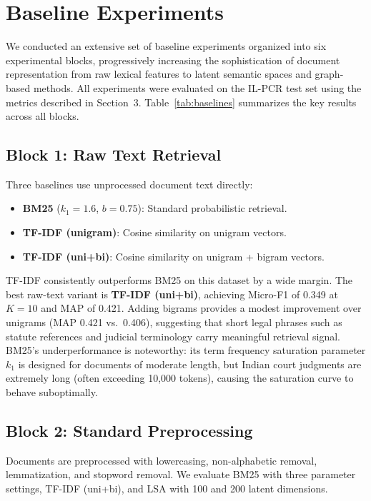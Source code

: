 \documentclass[11pt]{article}
\begin{document}
\section{Baseline Experiments}

We conducted an extensive set of baseline experiments organized into six experimental blocks, progressively increasing the sophistication of document representation from raw lexical features to latent semantic spaces and graph-based methods.
All experiments were evaluated on the IL-PCR test set using the metrics described in Section~3.
Table~\ref{tab:baselines} summarizes the key results across all blocks.

\subsection{Block 1: Raw Text Retrieval}

Three baselines use unprocessed document text directly:
\begin{itemize}
    \item \textbf{BM25} ($k_1{=}1.6$, $b{=}0.75$): Standard probabilistic retrieval.
    \item \textbf{TF-IDF (unigram)}: Cosine similarity on unigram vectors.
    \item \textbf{TF-IDF (uni+bi)}: Cosine similarity on unigram + bigram vectors.
\end{itemize}

TF-IDF consistently outperforms BM25 on this dataset by a wide margin.
The best raw-text variant is \textbf{TF-IDF (uni+bi)}, achieving Micro-F1 of 0.349 at $K{=}10$ and MAP of 0.421.
Adding bigrams provides a modest improvement over unigrams (MAP 0.421 vs.~0.406), suggesting that short legal phrases such as statute references and judicial terminology carry meaningful retrieval signal.
BM25's underperformance is noteworthy: its term frequency saturation parameter $k_1$ is designed for documents of moderate length, but Indian court judgments are extremely long (often exceeding 10,000 tokens), causing the saturation curve to behave suboptimally.

\subsection{Block 2: Standard Preprocessing}

Documents are preprocessed with lowercasing, non-alphabetic removal, lemmatization, and stopword removal.
We evaluate BM25 with three parameter settings, TF-IDF (uni+bi), and LSA with 100 and 200 latent dimensions.
\end{document}
